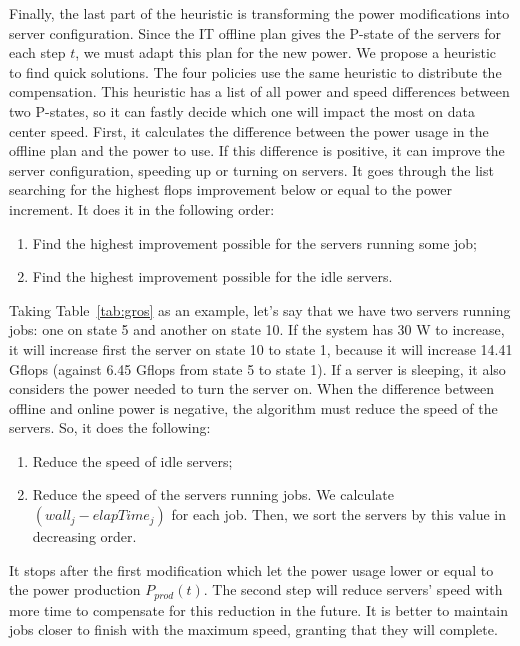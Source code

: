 Finally, the last part of the heuristic is transforming the power modifications into server configuration. Since the IT offline plan gives the P-state of the servers for each step $t$, we must adapt this plan for the new power. We propose a heuristic to find quick solutions. The four policies use the same heuristic to distribute the compensation. This heuristic has a list of all power and speed differences between two P-states, so it can fastly decide which one will impact the most on data center speed. First, it calculates the difference between the power usage in the offline plan and the power to use. If this difference is positive, it can improve the server configuration, speeding up or turning on servers. It goes through the list searching for the highest flops improvement below or equal to the power increment. It does it in the following order:
\begin{enumerate}
    \item Find the highest improvement possible for the servers running some job;
    \item Find the highest improvement possible for the idle servers.
\end{enumerate}

Taking Table~\ref{tab:gros} as an example, let's say that we have two servers running jobs: one on state 5 and another on state 10. If the system has 30 W to increase, it will increase first the server on state 10 to state 1, because it will increase 14.41 Gflops (against 6.45 Gflops from state 5 to state 1). If a server is sleeping, it also considers the power needed to turn the server on. When the difference between offline and online power is negative, the algorithm must reduce the speed of the servers. So, it does the following:
\begin{enumerate}
    \item Reduce the speed of idle servers;
    \item Reduce the speed of the servers running jobs. We calculate $(wall_{j} - elapTime_{j})$ for each job. Then, we sort the servers by this value in decreasing order.
\end{enumerate}

It stops after the first modification which let the power usage lower or equal to the power production $P_{prod}(t)$. The second step will reduce servers' speed with more time to compensate for this reduction in the future. It is better to maintain jobs closer to finish with the maximum speed, granting that they will complete.


